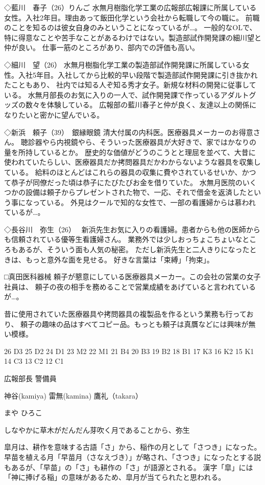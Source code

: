 ◇藍川　春子（26）りんご
水無月樹脂化学工業の広報部広報課に所属している女性。入社2年目。理由あって飯田化学という会社から転職して今の職に。
前職のことを知るのは彼女自身のみということになっているが…。
一般的なOLで、特に得意なことや苦手なことがあるわけではない。製造部試作開発課の細川望と仲が良い。
仕事一筋のところがあり、部内での評価も高い。


◇細川　望（26）
水無月樹脂化学工業の製造部試作開発課に所属している女性。入社5年目。入社してから比較的早い段階で製造部試作開発課に引き抜かれたこともあり、
社内では知る人ぞ知る秀才女子。新規な材料の開発に従事している。
水無月部長のお気に入りの一人で、試作開発課で作っているアダルトグッズの数々を体験している。
広報部の藍川春子と仲が良く、友達以上の関係になりたいと密かに望んでいる。

◇新浜　頼子（39）　銀縁眼鏡
清大付属の内科医。医療器具メーカーのお得意さん。
聴診器やら内視鏡やら、そういった医療器具が大好きで、家ではかなりの量を所持しているとか。
歴史的な価値がどうのこうとと理屈を並べて、大昔に使われていたらしい、医療器具だか拷問器具だかわからないような器具を収集している。
給料のほとんどはこれらの器具の収集に費やされているせいか、かつて恭子が同僚だった頃は恭子にたびたびお金を借りていた。
水無月医院のいくつかの設備は頼子からプレゼントされた物で、一応、それで借金を返済したという事になっている。
外見はクールで知的な女性で、一部の看護婦からは慕われているが…。

◇長谷川　弥生（26）　
新浜先生お気に入りの看護婦。患者からも他の医師からも信頼されている優等生看護婦さん。
業務外では少しおっちょこちょいなところもあるが、そういう面も人気の秘密。
ただし新浜先生と二人きりになったときは、もっと意外な面を見せる。
好きな言葉は「束縛」「拘束」。


□真田医科器械
頼子が懇意にしている医療器具メーカー。この会社の営業の女子社員は、
頼子の夜の相手を務めることで営業成績をあげていると言われているが…。

昔に使用されていた医療器具や拷問器具の複製品を作るという業務も行っており、
頼子の趣味の品はすべてコピー品。もっとも頼子は真贋などには興味が無い模様。

26 D3
25 D2
24 D1
23 M2
22 M1
21 B4
20 B3
19 B2
18 B1
17 K3
16 K2
15 K1
14 C3
13 C2
12 C1

広報部長
警備員


神谷(kamiya)
雷無(kamina)
鷹礼（takara）

まや
ひろこ

しなやかに草木がだんだん芽吹く月であることから、弥生

皐月は、耕作を意味する古語「さ」から、稲作の月として「さつき」になった。
早苗を植える月「早苗月（さなえづき）」が略され、「さつき」になったとする説もあるが、「早苗」の「さ」も耕作の「さ」が語源とされる。
漢字「皐」には「神に捧げる稲」の意味があるため、皐月が当てられたと思われる。


